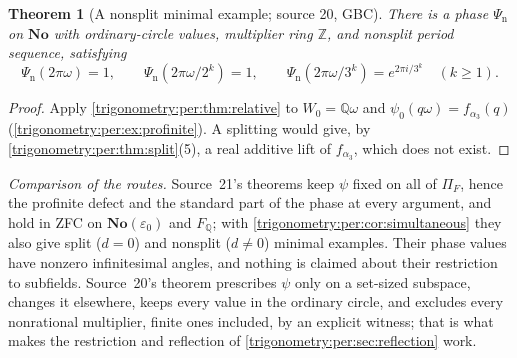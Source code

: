 \documentclass[11pt,letterpaper]{article}
\numberwithin{equation}{section}
\newtheorem{theorem}{Theorem}[section]
\theoremstyle{definition}
\theoremstyle{remark}
\newcommand{\No}{\mathbf{No}}
\newcommand{\Q}{\mathbb Q}
\newcommand{\Z}{\mathbb Z}
\newcommand{\eps}{\varepsilon}
\begin{document}
\begin{theorem}[A nonsplit minimal example; source 20, GBC]\label{trigonometry:per:thm:nonsplit}
There is a phase $\Psi_{\mathrm n}$ on $\No$ with ordinary-circle values, multiplier ring $\Z$, and
nonsplit period sequence, satisfying
\[
 \Psi_{\mathrm n}(2\pi\omega)=1,\qquad\Psi_{\mathrm n}(2\pi\omega/2^k)=1,\qquad
 \Psi_{\mathrm n}(2\pi\omega/3^k)=e^{2\pi i/3^k}\quad(k\ge1).
\]
\end{theorem}
\begin{proof}
Apply \cref{trigonometry:per:thm:relative} to $W_0=\Q\omega$ and $\psi_0(q\omega)=f_{\alpha_3}(q)$
(\cref{trigonometry:per:ex:profinite}). A splitting would give, by
\cref{trigonometry:per:thm:split}(5), a real additive lift of $f_{\alpha_3}$, which does not exist.
\end{proof}
\emph{Comparison of the routes.} Source~21's theorems keep $\psi$ fixed on all of $\Pi_F$, hence the
profinite defect and the standard part of the phase at every argument, and hold in ZFC on
$\No(\eps_0)$ and $F_{\Q}$; with \cref{trigonometry:per:cor:simultaneous} they also give split
($d=0$) and nonsplit ($d\ne0$) minimal examples. Their phase values have nonzero infinitesimal
angles, and nothing is claimed about their restriction to subfields. Source~20's theorem prescribes
$\psi$ only on a set-sized subspace, changes it elsewhere, keeps every value in the ordinary circle, and
excludes every nonrational multiplier, finite ones included, by an explicit witness; that is what makes
the restriction and reflection of \cref{trigonometry:per:sec:reflection} work.
\end{document}
